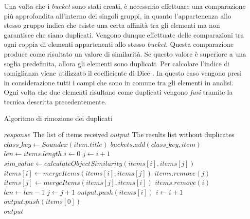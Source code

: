 Una volta che i \emph{bucket} sono stati creati, è necessario effettuare una comparazione più approfondita all'interno dei singoli gruppi, in quanto l'appartenenza allo stesso gruppo indica che esiste una certa affinità tra gli elementi ma non garantisce che siano duplicati. Vengono dunque effettuate delle comparazioni tra ogni coppia di elementi appartenenti allo stesso \emph{bucket}. Questa comparazione produce come risultato un valore di similarità. Se questo valore è superiore a una soglia predefinita, allora gli elementi sono duplicati. Per calcolare l'indice di somiglianza viene utilizzato il coefficiente di Dice \cite{dice1945measures}. In questo caso vengono presi in considerazione tutti i campi che sono in comune tra gli elementi in analisi. Ogni volta che due elementi risultano come duplicati vengono \emph{fusi} tramite la tecnica descritta precedentemente.

\begin{algorithm}
	\caption{Algoritmo di rimozione dei duplicati}
	\label{alg:algoritmo-rimozione-duplicati}
	\begin{algorithmic}
		\Require
			\Statex $ response $ \Comment The list of items received
		\Ensure
			\Statex $ output $ \Comment The results list without duplicates
		\Statex
			\State $ class\_key \gets Soundex(item.title) $
			\State $ buckets.add(class\_key, item) $
		\EndFor
			\State $ len \gets items.length $
				\State $ i \gets 0 $
					\State $ j \gets i + 1 $
						\State $ sim\_value \gets calculateObjectSimilarity(items[i], items[j])$
								\State $ items[i] \gets mergeItems(items[i], items[j]) $
								\State $ items.remove(j) $
							\Else
								\State $ items[j] \gets mergeItems(items[j], items[i]) $
								\State $ items.remove(i) $
							\EndIf
							\State $ len \gets len - 1 $
						\Else
							\State $ j \gets j + 1 $
						\EndIf
					\EndWhile
					\State $ output.push(items[i]) $
					\State $ i \gets i + 1 $
				\EndWhile
			\Else
				\State $ output.push(items[0]) $
			\EndIf
		\EndFor\\
		\Return $ output $
	\end{algorithmic}
\end{algorithm}

